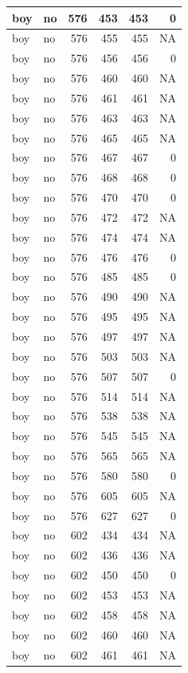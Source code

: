\documentclass[man]{apa6}
\begin{document}
\begin{tabular}{l|l|r|r|r|r}
\hline
boy & no & 576 & 453 & 453 & 0\\
\hline
boy & no & 576 & 455 & 455 & NA\\
\hline
boy & no & 576 & 456 & 456 & 0\\
\hline
boy & no & 576 & 460 & 460 & NA\\
\hline
boy & no & 576 & 461 & 461 & NA\\
\hline
boy & no & 576 & 463 & 463 & NA\\
\hline
boy & no & 576 & 465 & 465 & NA\\
\hline
boy & no & 576 & 467 & 467 & 0\\
\hline
boy & no & 576 & 468 & 468 & 0\\
\hline
boy & no & 576 & 470 & 470 & 0\\
\hline
boy & no & 576 & 472 & 472 & NA\\
\hline
boy & no & 576 & 474 & 474 & NA\\
\hline
boy & no & 576 & 476 & 476 & 0\\
\hline
boy & no & 576 & 485 & 485 & 0\\
\hline
boy & no & 576 & 490 & 490 & NA\\
\hline
boy & no & 576 & 495 & 495 & NA\\
\hline
boy & no & 576 & 497 & 497 & NA\\
\hline
boy & no & 576 & 503 & 503 & NA\\
\hline
boy & no & 576 & 507 & 507 & 0\\
\hline
boy & no & 576 & 514 & 514 & NA\\
\hline
boy & no & 576 & 538 & 538 & NA\\
\hline
boy & no & 576 & 545 & 545 & NA\\
\hline
boy & no & 576 & 565 & 565 & NA\\
\hline
boy & no & 576 & 580 & 580 & 0\\
\hline
boy & no & 576 & 605 & 605 & NA\\
\hline
boy & no & 576 & 627 & 627 & 0\\
\hline
boy & no & 602 & 434 & 434 & NA\\
\hline
boy & no & 602 & 436 & 436 & NA\\
\hline
boy & no & 602 & 450 & 450 & 0\\
\hline
boy & no & 602 & 453 & 453 & NA\\
\hline
boy & no & 602 & 458 & 458 & NA\\
\hline
boy & no & 602 & 460 & 460 & NA\\
\hline
boy & no & 602 & 461 & 461 & NA\\

\end{tabular}
\end{document}
